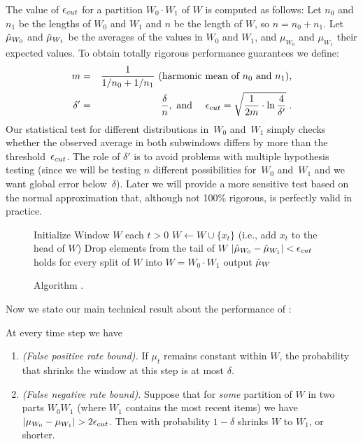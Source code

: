 The value of $\epsilon_{cut}$ for a partition $W_0\cdot W_1$ of $W$ 
is computed as follows: Let $n_0$ and $n_1$ be the lengths
of $W_0$ and $W_1$ and $n$ be the length of $W$, so $n=n_0+n_1$. 
Let $\hat{\mu}_{W_0}$ and $\hat{\mu}_{W_1}$ be the averages of the values
in $W_0$ and $W_1$, and $\mu_{W_0}$ and $\mu_{W_1}$
their expected values. 
To obtain totally rigorous performance guarantees we define:
%
\begin{eqnarray*}
m &=& \frac{1}{1/n_0 + 1/n_1} \mbox{ (harmonic mean of $n_0$ and $n_1$),} \\
\delta'&=&\frac{\delta}{n}, \mbox{ and } \quad
\epsilon_{cut} = \sqrt{\frac{1}{2m} \cdot \ln\frac{4}{\delta'}} \;.
\end{eqnarray*}
%
Our statistical test for different distributions in~$W_0$ and~$W_1$ 
simply checks whether the observed average in both subwindows differs 
by more than the threshold~$\epsilon_{cut}$.
The role of $\delta'$ is to avoid problems with multiple hypothesis
testing (since we will be testing $n$ different possibilities 
for~$W_0$ and~$W_1$ and we want global error below~$\delta$). 
Later we will provide a more sensitive test based on the normal approximation 
that, although not 100\% rigorous, is perfectly valid in practice. 

\begin{figure}

\centering

\begin{codebox}
\li Initialize Window $W$
\li \For each $t >0$ %
\li \Do $W \gets W \cup \{x_t\}$ (i.e., add $x_t$ to the head of $W$)
\li \Repeat Drop elements from the tail of $W$ 
\li \Until $|\hat{\mu}_{W_0}-\hat{\mu}_{W_1}|  < \epsilon_{cut}$ holds %
\li \quad\quad for every split of $W$ into $W=W_0 \cdot W_1$ 
\li output $\hat{\mu}_{W}$ %
\end{codebox}
\caption{Algorithm \adwinzz.}\label{blnAlgorithm}
\end{figure}

Now we state our main technical result about the performance of \adwinzz:

\begin{theorem}
\label{ThBV}
At every time step we have 

\begin{enumerate}
\item {\em (False positive rate bound).} If $\mu_t$ remains constant within $W$, 
the probability that \adwinz shrinks the window 
at this step is at most $\delta$.

\item {\em (False negative rate bound).} 
Suppose that for {\em some} partition of $W$ in two parts $W_0W_1$ 
(where $W_1$ contains the most recent items) 
we have $|\mu_{W_0}-\mu_{W_1}| > 2\epsilon_{cut}$. 
Then with probability $1-\delta$ \adwinz
shrinks $W$ to $W_1$, or shorter.
\end{enumerate}
\end{theorem}

